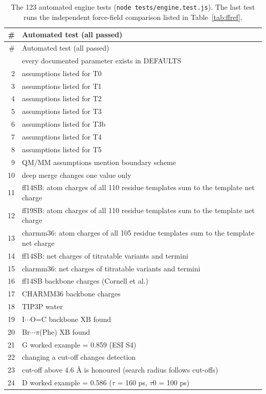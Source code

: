 {\scriptsize
\setlength{\tabcolsep}{3pt}
\begin{longtable}{rp{14.5cm}}
\caption{The 123 automated engine tests (\texttt{node tests/engine.test.js}). The last test runs the independent force-field comparison listed in Table~\ref{tab:ffref}.}\label{tab:tests}\\
\toprule
\# & Automated test (all passed)\\
\midrule
\endfirsthead
\toprule
\# & Automated test (all passed)\\
\midrule
\endhead
\bottomrule
\endlastfoot
1 & every documented parameter exists in DEFAULTS\\
2 & assumptions listed for T0\\
3 & assumptions listed for T1\\
4 & assumptions listed for T2\\
5 & assumptions listed for T3\\
6 & assumptions listed for T3b\\
7 & assumptions listed for T4\\
8 & assumptions listed for T5\\
9 & QM/MM assumptions mention boundary scheme\\
10 & deep merge changes one value only\\
11 & ff14SB: atom charges of all 110 residue templates sum to the template net charge\\
12 & ff19SB: atom charges of all 110 residue templates sum to the template net charge\\
13 & charmm36: atom charges of all 105 residue templates sum to the template net charge\\
14 & ff14SB: net charges of titratable variants and termini\\
15 & charmm36: net charges of titratable variants and termini\\
16 & ff14SB backbone charges (Cornell et al.)\\
17 & CHARMM36 backbone charges\\
18 & TIP3P water\\
19 & I$\cdots$O=C backbone XB found\\
20 & Br$\cdots\pi$(Phe) XB found\\
21 & G worked example = 0.859 (ESI S4)\\
22 & changing a cut-off changes detection\\
23 & cut-off above 4.6 \AA{} is honoured (search radius follows cut-offs)\\
24 & D worked example = 0.586 ($\tau$ = 160 ps, $\tau$0 = 100 ps)\\

\end{longtable}}
